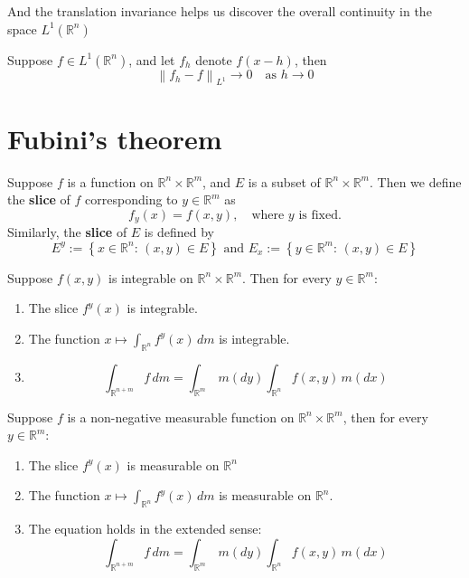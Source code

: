 \documentclass{ctexbook}
\begin{document}
And the translation invariance helps us discover the overall continuity in the space $L^1(\mathbb{R}^n)$
\begin{thm}
    Suppose $f \in L^1(\mathbb{R}^n)$, and let $f_h$ denote $f(x-h)$, then
    \[\left\lVert f_h - f\right\rVert _{L^1} \rightarrow 0\quad \text{as }h\rightarrow 0 \]
\end{thm}

\section{Fubini's theorem}

\begin{define}[slice]
    Suppose $f$ is a function on $\mathbb{R}^n \times \mathbb{R}^m$, and $E$ is a subset of $\mathbb{R}^n \times \mathbb{R}^m$.
    Then we define the \textbf{slice} of $f$ corresponding to $y \in \mathbb{R}^m$ as
    \[f_y(x) = f(x,y),\quad\text{where $y$ is fixed.}\]
    Similarly, the \textbf{slice} of $E$ is defined by 
    \[E^y := \left\{x \in \mathbb{R}^n:\,(x,y)\in E\right\} \text{ and } E_x := \left\{y \in \mathbb{R}^m:\,(x,y)\in E\right\}\]
\end{define}

\begin{thm}
    Suppose $f(x,y)$ is integrable on $\mathbb{R}^n \times \mathbb{R}^m$. Then for every $y\in\mathbb{R}^m$:
    \begin{enumerate}
        \item The slice $f^y(x)$ is integrable.
        \item The function $x \mapsto \int_{\mathbb{R}^n} f^y(x)\,dm$ is integrable.
        \item \[\int_{\mathbb{R}^{n+m}} f\,dm = \int_{\mathbb{R}^m}\,m(dy)\int_{\mathbb{R}^n}f(x,y)\,m(dx)\]
    \end{enumerate}
\end{thm}

\begin{thm}
    Suppose $f$ is a non-negative measurable function on $\mathbb{R}^n \times \mathbb{R}^m$, then for every $y \in \mathbb{R}^m$:
    \begin{enumerate}
        \item The slice $f^y(x)$ is measurable on $\mathbb{R}^n$
        \item The function $x \mapsto \int_{\mathbb{R}^n} f^y(x)\,dm$ is measurable on $\mathbb{R}^n$.
        \item The equation holds in the extended sense: \[\int_{\mathbb{R}^{n+m}} f\,dm = \int_{\mathbb{R}^m}\,m(dy)\int_{\mathbb{R}^n}f(x,y)\,m(dx)\]
    \end{enumerate}
\end{thm}
\end{document}
